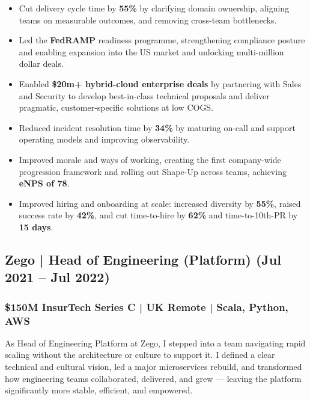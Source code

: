 \documentclass[12pt]{article}
\begin{document}
\begin{itemize}
  \item Cut delivery cycle time by \textbf{55\%} by clarifying domain ownership, aligning teams on measurable outcomes, and removing cross-team bottlenecks.
  \item Led the \textbf{FedRAMP} readiness programme, strengthening compliance posture and enabling expansion into the US market and unlocking multi-million dollar deals.
  \item Enabled \textbf{\$20m+ hybrid-cloud enterprise deals} by partnering with Sales and Security to develop best-in-class technical proposals and deliver pragmatic, customer-specific solutions at low COGS.
  \item Reduced incident resolution time by \textbf{34\%} by maturing on-call and support operating models and improving observability.
  \item Improved morale and ways of working, creating the first company-wide progression framework and rolling out Shape-Up across teams, achieving \textbf{eNPS of 78}.
  \item Improved hiring and onboarding at scale: increased diversity by \textbf{55\%}, raised success rate by \textbf{42\%}, and cut time-to-hire by \textbf{62\%} and time-to-10th-PR by \textbf{15 days}.
\end{itemize}

\subsection*{Zego | Head of Engineering (Platform) \small (Jul 2021 -- Jul 2022)}
\subsubsection*{\$150M InsurTech Series C | UK Remote | Scala, Python, AWS}

As Head of Engineering Platform at Zego, I stepped into a team navigating rapid scaling without the architecture or culture to support it. I defined a clear technical and cultural vision, led a major microservices rebuild, and transformed how engineering teams collaborated, delivered, and grew --- leaving the platform significantly more stable, efficient, and empowered.
\end{document}
